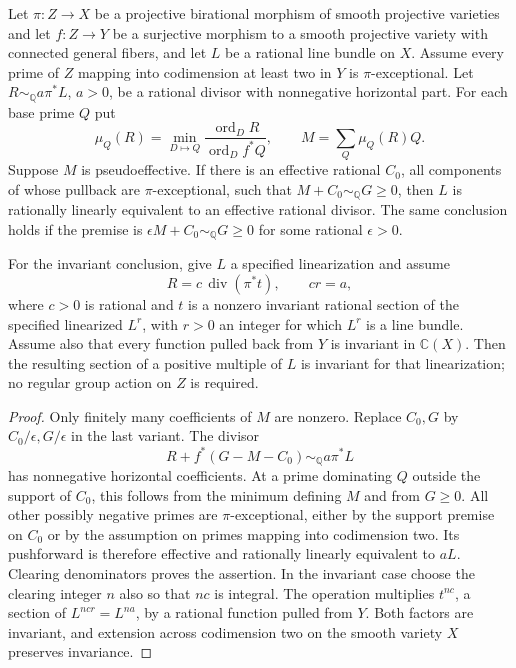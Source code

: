 \begin{lemma}\label{conv:return}
Let $\pi:Z\to X$ be a projective birational morphism of smooth
projective varieties and let $f:Z\to Y$ be a surjective morphism to a
smooth projective variety with connected general fibers, and let $L$ be
a rational line bundle on $X$.  Assume every
prime of $Z$ mapping into codimension at least two in $Y$ is
$\pi$-exceptional.  Let $R\sim_{\mathbb Q}a\pi^*L$, $a>0$, be a
rational divisor with nonnegative horizontal part.  For each base prime
$Q$ put
\[
 \mu_Q(R)=\min_{D\mapsto Q}
 \frac{\operatorname{ord}_D R}{\operatorname{ord}_D f^*Q},
 \qquad M=\sum_Q\mu_Q(R)Q.
\]
Suppose $M$ is pseudoeffective.  If there is an effective rational
$C_0$, all components of whose pullback are $\pi$-exceptional, such that
$M+C_0\sim_{\mathbb Q}G\ge0$, then $L$ is rationally linearly
equivalent to an effective rational divisor.  The same conclusion holds
if the premise is $\epsilon M+C_0\sim_{\mathbb Q}G\ge0$ for some
rational $\epsilon>0$.

For the invariant conclusion, give $L$ a specified linearization and
assume
\[
 R=c\,\operatorname{div}(\pi^*t),\qquad cr=a,
\]
where $c>0$ is rational and $t$ is a nonzero invariant rational section
of the specified linearized $L^r$, with $r>0$ an integer for which
$L^r$ is a line bundle.  Assume also that every function pulled back
from $Y$ is invariant in $\mathbb C(X)$.  Then the resulting section
of a positive multiple of $L$ is invariant for that linearization;
no regular group action on $Z$ is required.
\end{lemma}
\begin{proof}
Only finitely many coefficients of $M$ are nonzero.  Replace $C_0,G$ by
$C_0/\epsilon,G/\epsilon$ in the last variant.  The divisor
\[
 R+f^*(G-M-C_0)\sim_{\mathbb Q}a\pi^*L
\]
has nonnegative horizontal coefficients.  At a prime dominating $Q$
outside the support of $C_0$, this follows from the minimum defining
$M$ and from $G\ge0$.  All other possibly negative primes are
$\pi$-exceptional, either by the support premise on $C_0$ or by the
assumption on primes mapping into codimension two.  Its pushforward is
therefore effective and rationally linearly equivalent to $aL$.
Clearing denominators proves the assertion.  In the invariant case
choose the clearing integer $n$ also so that $nc$ is integral.  The
operation multiplies $t^{nc}$, a section of $L^{ncr}=L^{na}$, by a
rational function pulled from $Y$.  Both factors are invariant, and
extension across codimension two on the smooth variety $X$ preserves
invariance.
\end{proof}

